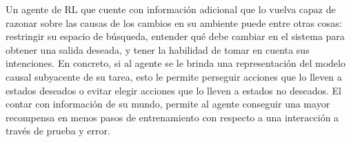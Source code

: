 Un agente de RL que cuente con información adicional que lo vuelva 
capaz de razonar sobre las causas de los cambios en su ambiente 
puede entre otras cosas: restringir su espacio de búsqueda, 
entender qué debe cambiar en el sistema para obtener una salida
deseada, y tener la habilidad de tomar en cuenta sus intenciones.
En concreto, si al agente se le brinda una representación del modelo
causal subyacente de su tarea, esto le permite perseguir acciones que lo lleven a
estados deseados o evitar elegir acciones que lo lleven a 
estados no deseados. El contar con información de su mundo, permite
al agente conseguir una mayor recompensa en menos pasos de entrenamiento 
con respecto a una interacción a través de prueba y error.







